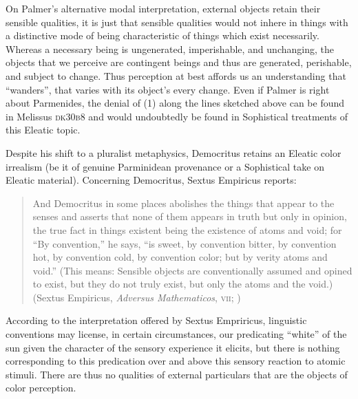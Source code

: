 On Palmer's \citeyearpar{Palmer:2009qf} alternative modal interpretation, external objects retain their sensible qualities, it is just that sensible qualities would not inhere in things with a distinctive mode of being characteristic of things which exist necessarily. Whereas a necessary being is ungenerated, imperishable, and unchanging, the objects that we perceive are contingent beings and thus are generated, perishable, and subject to change. Thus perception at best affords us an understanding that ``wanders'', that varies with its object's every change. Even if Palmer is right about Parmenides, the denial of (1) along the lines sketched above can be found in Melissus \textsc{dk}30\textsc{b}8 and would undoubtedly be found in Sophistical treatments of this Eleatic topic.

Despite his shift to a pluralist metaphysics, Democritus retains an Eleatic color irrealism (be it of genuine Parminidean provenance or a Sophistical take on Eleatic material). Concerning Democritus, Sextus Empiricus reports:
\begin{quote}
	And Democritus in some places abolishes the things that appear to the senses and asserts that none of them appears in truth but only in opinion, the true fact in things existent being the existence of atoms and void; for ``By convention,'' he says, ``is sweet, by convention bitter, by convention hot, by convention cold, by convention color; but by verity atoms and void.'' (This means: Sensible objects are conventionally assumed and opined to exist, but they do not truly exist, but only the atoms and the void.) (Sextus Empiricus, \emph{Adversus Mathematicos}, \textsc{vii}; \citealt[135--136]{Bury:1997uq})
\end{quote}
According to the interpretation offered by Sextus Empriricus, linguistic conventions may license, in certain circumstances, our predicating ``white'' of the sun given the character of the sensory experience it elicits, but there is nothing corresponding to this predication over and above this sensory reaction to atomic stimuli. There are thus no qualities of external particulars that are the objects of color perception. 

